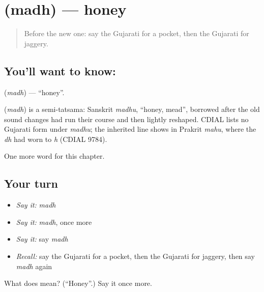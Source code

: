 \section[\texorpdfstring{\gu{મધ} (madh)}{મધ (madh)}]{ (madh) — honey}

\label{lesson:GU-C113-madh}



\begin{quote}
Before the new one: say the Gujarati for a pocket, then the Gujarati for jaggery.
\end{quote}

\subsection*{You'll want to know: }
\textbf{} (\emph{madh}) — \textquotedblleft{}honey\textquotedblright{}.

\begin{cousinweb}
\textbf{} (\emph{madh}) is a semi-tatsama: Sanskrit \emph{madhu}, \textquotedblleft{}honey, mead\textquotedblright{}, borrowed after the old sound changes had run their course and then lightly reshaped. CDIAL lists no Gujarati form under \emph{madhu}; the inherited line shows in Prakrit \emph{mahu}, where the \emph{dh} had worn to \emph{h} (CDIAL 9784).
\end{cousinweb}

\begin{grammarlens}[title={What you've built}]
One more word for this chapter.
\end{grammarlens}

\subsection*{Your turn}
\begin{itemize}
\raggedright
  \item \emph{Say it:} \emph{madh}
  \item \emph{Say it:} \emph{madh}, once more
  \item \emph{Say it:} say \emph{madh}
  \item \emph{Recall:} say the Gujarati for a pocket, then the Gujarati for jaggery, then say \emph{madh} again
\end{itemize}

\begin{tcolorbox}[breakable,colback=teal!4,colframe=teal!35!black,title={Before you move on}]
What does  mean? (\textquotedblleft{}Honey\textquotedblright{}.) Say it once more.
\end{tcolorbox}
